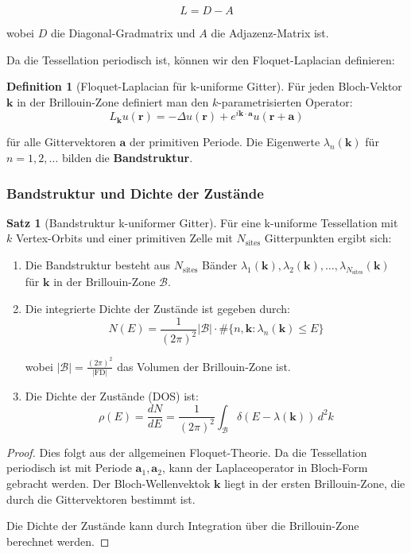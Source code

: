 \documentclass[a4paper,12pt]{article}
\theoremstyle{definition}
\newtheorem{definition}{Definition}[section]
\newtheorem{satz}{Satz}[section]
\begin{document}
\[
L = D - A
\]

wobei $D$ die Diagonal-Gradmatrix und $A$ die Adjazenz-Matrix ist.

Da die Tessellation periodisch ist, können wir den Floquet-Laplacian definieren:

\begin{definition}[Floquet-Laplacian für k-uniforme Gitter]
	Für jeden Bloch-Vektor $\mathbf{k}$ in der Brillouin-Zone definiert man den $k$-parametrisierten Operator:
	\[
	L_\mathbf{k} u(\mathbf{r}) = -\Delta u(\mathbf{r}) + e^{i \mathbf{k} \cdot \mathbf{a}} u(\mathbf{r} + \mathbf{a})
	\]
	
	für alle Gittervektoren $\mathbf{a}$ der primitiven Periode. Die Eigenwerte $\lambda_n(\mathbf{k})$ für $n = 1, 2, \ldots$ bilden die \textbf{Bandstruktur}.
\end{definition}

\subsubsection{Bandstruktur und Dichte der Zustände}

\begin{satz}[Bandstruktur k-uniformer Gitter]
	Für eine k-uniforme Tessellation mit $k$ Vertex-Orbits und einer primitiven Zelle mit $N_{\text{sites}}$ Gitterpunkten ergibt sich:
	
	\begin{enumerate}
		\item Die Bandstruktur besteht aus $N_{\text{sites}}$ Bänder $\lambda_1(\mathbf{k}), \lambda_2(\mathbf{k}), \ldots, \lambda_{N_{\text{sites}}}(\mathbf{k})$ für $\mathbf{k}$ in der Brillouin-Zone $\mathcal{B}$.
		
		\item Die integrierte Dichte der Zustände ist gegeben durch:
		\[
		N(E) = \frac{1}{(2\pi)^2} \left| \mathcal{B} \right| \cdot \#\{ n, \mathbf{k} : \lambda_n(\mathbf{k}) \leq E \}
		\]
		
		wobei $\left| \mathcal{B} \right| = \frac{(2\pi)^2}{|\text{FD}|}$ das Volumen der Brillouin-Zone ist.
		
		\item Die Dichte der Zustände (DOS) ist:
		\[
		\rho(E) = \frac{dN}{dE} = \frac{1}{(2\pi)^2} \int_{\mathcal{B}} \delta(E - \lambda(\mathbf{k})) \, d^2k
		\]
	\end{enumerate}
\end{satz}

\begin{proof}
	Dies folgt aus der allgemeinen Floquet-Theorie. Da die Tessellation periodisch ist mit Periode $\mathbf{a}_1, \mathbf{a}_2$, kann der Laplaceoperator in Bloch-Form gebracht werden. Der Bloch-Wellenvektok $\mathbf{k}$ liegt in der ersten Brillouin-Zone, die durch die Gittervektoren bestimmt ist.
	
	Die Dichte der Zustände kann durch Integration über die Brillouin-Zone berechnet werden.
\end{proof}
\end{document}
